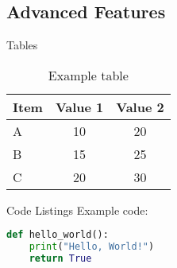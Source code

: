 \subsection{Advanced Features}

\begin{frame}{Tables}
    \begin{table}
        \centering
        \caption{Example table}
        \begin{tabular}{lcc}
            \toprule
            \textbf{Item} & \textbf{Value 1} & \textbf{Value 2} \\
            \midrule
            A & 10 & 20 \\
            B & 15 & 25 \\
            C & 20 & 30 \\
            \bottomrule
        \end{tabular}
    \end{table}
\end{frame}

\begin{frame}[fragile]{Code Listings}
    Example code:

    \begin{lstlisting}[language=Python, basicstyle=\ttfamily\small]
def hello_world():
    print("Hello, World!")
    return True
    \end{lstlisting}
\end{frame}

